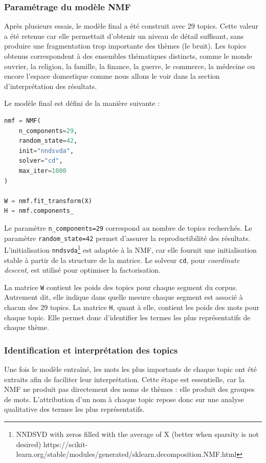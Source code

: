 \documentclass{article}
\begin{document}
\subsubsection{Paramétrage du modèle NMF}

Après plusieurs essais, le modèle final a été construit avec 29 topics. Cette valeur a été retenue car elle permettait d'obtenir un niveau de détail suffisant, sans produire une fragmentation trop importante des thèmes (le bruit). Les topics obtenus correspondent à des ensembles thématiques distincts, comme le monde ouvrier, la religion, la famille, la finance, la guerre, le commerce, la médecine ou encore l'espace domestique comme nous allons le voir dans la section d'interprétation des résultats.

Le modèle final est défini de la manière suivante :

\begin{lstlisting}[language=Python, caption={Entraînement du modèle NMF final}]
nmf = NMF(
    n_components=29,
    random_state=42,
    init="nndsvda",
    solver="cd",
    max_iter=1000
)

W = nmf.fit_transform(X)
H = nmf.components_
\end{lstlisting}

Le paramètre \texttt{n\_components=29} correspond au nombre de topics recherchés. Le paramètre \texttt{random\_state=42} permet d'assurer la reproductibilité des résultats. L'initialisation \texttt{nndsvda}\footnote{NNDSVD with zeros filled with the average of X (better when sparsity is not desired) https://scikit-learn.org/stable/modules/generated/sklearn.decomposition.NMF.html } est adaptée à la NMF, car elle fournit une initialisation stable à partir de la structure de la matrice. Le solveur \texttt{cd}, pour \textit{coordinate descent}, est utilisé pour optimiser la factorisation.

La matrice \texttt{W} contient les poids des topics pour chaque segment du corpus. Autrement dit, elle indique dans quelle mesure chaque segment est associé à chacun des 29 topics. La matrice \texttt{H}, quant à elle, contient les poids des mots pour chaque topic. Elle permet donc d'identifier les termes les plus représentatifs de chaque thème.

\subsubsection{Identification et interprétation des topics}

Une fois le modèle entraîné, les mots les plus importants de chaque topic ont été extraits afin de faciliter leur interprétation. Cette étape est essentielle, car la NMF ne produit pas directement des noms de thèmes : elle produit des groupes de mots. L'attribution d'un nom à chaque topic repose donc sur une analyse qualitative des termes les plus représentatifs.
\end{document}
